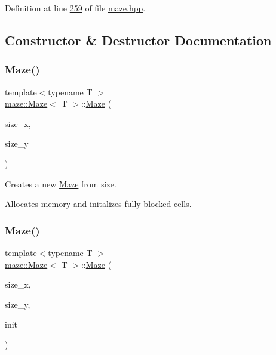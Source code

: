 Definition at line \hyperlink{maze_8hpp_source_l00259}{259} of file \hyperlink{maze_8hpp_source}{maze.\+hpp}.



\subsection{Constructor \& Destructor Documentation}
\mbox{\label{classmaze_1_1Maze_aef611081ed7197864535e22586a58ff7}} 
\subsubsection{\texorpdfstring{Maze()}{Maze()}\hspace{0.1cm}{\footnotesize\ttfamily [1/3]}}
{\footnotesize\ttfamily template$<$typename T $>$ \\
\hyperlink{classmaze_1_1Maze}{maze\+::\+Maze}$<$ T $>$\+::\hyperlink{classmaze_1_1Maze}{Maze} (\begin{DoxyParamCaption}\item[{\hyperlink{namespacemaze_ae8120a098fabafbbfa264a3c619640b3}{index}}]{size\+\_\+x,  }\item[{\hyperlink{namespacemaze_ae8120a098fabafbbfa264a3c619640b3}{index}}]{size\+\_\+y }\end{DoxyParamCaption})}



Creates a new \hyperlink{classmaze_1_1Maze}{Maze} from size. 

Allocates memory and initalizes fully blocked cells. \mbox{\label{classmaze_1_1Maze_a43bdce0a7eca808b51174a005c5840c4}} 
\subsubsection{\texorpdfstring{Maze()}{Maze()}\hspace{0.1cm}{\footnotesize\ttfamily [2/3]}}
{\footnotesize\ttfamily template$<$typename T $>$ \\
\hyperlink{classmaze_1_1Maze}{maze\+::\+Maze}$<$ T $>$\+::\hyperlink{classmaze_1_1Maze}{Maze} (\begin{DoxyParamCaption}\item[{\hyperlink{namespacemaze_ae8120a098fabafbbfa264a3c619640b3}{index}}]{size\+\_\+x,  }\item[{\hyperlink{namespacemaze_ae8120a098fabafbbfa264a3c619640b3}{index}}]{size\+\_\+y,  }\item[{\hyperlink{classmaze_1_1RawCell}{Raw\+Cell}$<$ \hyperlink{classmaze_1_1Maze_a9f056be7a10507d578e4608e31a3d6fc}{type} $>$}]{init }\end{DoxyParamCaption})}



